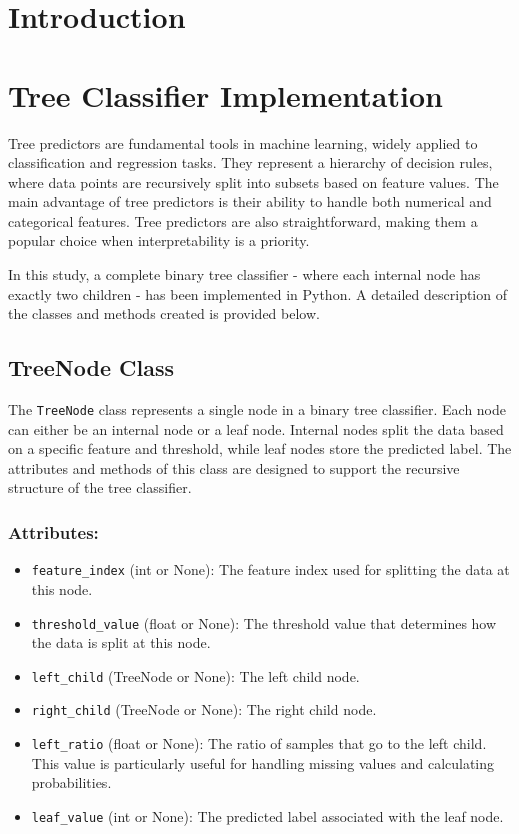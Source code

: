 \documentclass{article}
\begin{document}
\tableofcontents

\section{Introduction}

\section{Tree Classifier Implementation}

Tree predictors are fundamental tools in machine learning, widely applied to classification and regression tasks. They represent a hierarchy of decision rules, where data points are recursively split into subsets based on feature values. The main advantage of tree predictors is their ability to handle both numerical and categorical features. Tree predictors are also straightforward, making them a popular choice when interpretability is a priority.

In this study, a complete binary tree classifier - where each internal node has exactly two children - has been implemented in Python. A detailed description of the classes and methods created is provided below.

\subsection{TreeNode Class}

The \texttt{TreeNode} class represents a single node in a binary tree classifier. Each node can either be an internal node or a leaf node. Internal nodes split the data based on a specific feature and threshold, while leaf nodes store the predicted label. The attributes and methods of this class are designed to support the recursive structure of the tree classifier.

\subsubsection*{Attributes:}
\begin{itemize}
    \item \texttt{feature\_index} (int or None): The feature index used for splitting the data at this node.
    \item \texttt{threshold\_value} (float or None): The threshold value that determines how the data is split at this node.
    \item \texttt{left\_child} (TreeNode or None): The left child node.
    \item \texttt{right\_child} (TreeNode or None): The right child node.
    \item \texttt{left\_ratio} (float or None): The ratio of samples that go to the left child. This value is particularly useful for handling missing values and calculating probabilities.
    \item \texttt{leaf\_value} (int or None): The predicted label associated with the leaf node.
\end{itemize}
\end{document}
